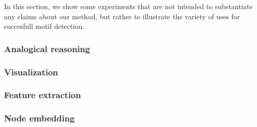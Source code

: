 \documentclass[11pt]{article}
\begin{document}

In this section, we show some experiments that are not intended to substantiate any claims about our method, but rather to illustrate the variety of uses for succesfull motif detection. 

\subsubsection{Analogical reasoning}

\subsubsection{Visualization}

\subsubsection{Feature extraction}

\subsubsection{Node embedding}


\end{document}
